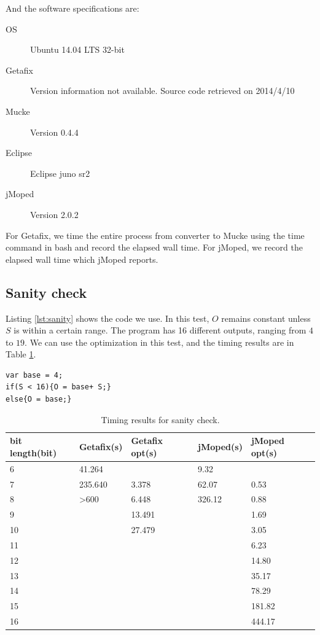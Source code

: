 And the software specifications are:
\begin{description}
  \item[OS] Ubuntu 14.04 LTS 32-bit
  \item[Getafix] Version information not available. Source code retrieved on 2014/4/10
  \item[Mucke] Version 0.4.4
  \item[Eclipse] Eclipse juno sr2
  \item[jMoped] Version 2.0.2
\end{description}

For Getafix, we time the entire process from converter to Mucke using the time command in bash and record the elapsed wall time. For jMoped, we record the elapsed wall time which jMoped reports.

\subsection{Sanity check}
Listing \ref{lst:sanity} shows the code we use. In this test, $O$ remains constant unless $S$ is within a certain range. The program has 16 different outputs, ranging from $4$ to $19$. We can use the optimization in this test, and the timing results are in Table \ref{tbl:sanity}.

\lstset{language=C}  
\begin{lstlisting}[float=!h, caption={Sanity check test program.},label=lst:sanity]
var base = 4;
if(S < 16){O = base+ S;}
else{O = base;}
\end{lstlisting}

\begin{table}[!h]
\begin{center}
\begin{tabular}{|l|l|l|l|l|}
\hline
bit length(bit) & Getafix(s) & Getafix opt(s) & jMoped(s) & jMoped opt(s) \\ \hline
6 & 41.264 &  & 9.32 &  \\ \hline
7 & 235.640 & 3.378 & 62.07 & 0.53 \\ \hline
8 & \textgreater600 & 6.448 & 326.12 & 0.88 \\ \hline
9 &  & 13.491 &  & 1.69 \\ \hline
10 &  & 27.479 &  & 3.05 \\ \hline
11 &  &  &  & 6.23 \\ \hline
12 &  &  &  & 14.80 \\ \hline
13 &  &  &  & 35.17 \\ \hline
14 &  &  &  & 78.29 \\ \hline
15 &  &  &  & 181.82 \\ \hline
16 &  &  &  & 444.17 \\ \hline
\end{tabular}
\end{center}
\caption{Timing results for sanity check.}
\label{tbl:sanity}
\end{table}

